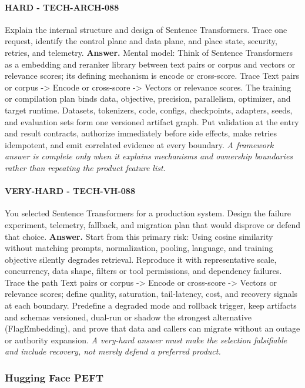 \paragraph{HARD - TECH-ARCH-088} Explain the internal structure and design of Sentence Transformers. Trace one request, identify the control plane and data plane, and place state, security, retries, and telemetry.
\textbf{Answer.} Mental model: Think of Sentence Transformers as a embedding and reranker library between text pairs or corpus and vectors or relevance scores; its defining mechanism is encode or cross-score. Trace Text pairs or corpus -> Encode or cross-score -> Vectors or relevance scores. The training or compilation plan binds data, objective, precision, parallelism, optimizer, and target runtime. Datasets, tokenizers, code, configs, checkpoints, adapters, seeds, and evaluation sets form one versioned artifact graph. Put validation at the entry and result contracts, authorize immediately before side effects, make retries idempotent, and emit correlated evidence at every boundary.
\textit{A framework answer is complete only when it explains mechanisms and ownership boundaries rather than repeating the product feature list.}
\paragraph{VERY-HARD - TECH-VH-088} You selected Sentence Transformers for a production system. Design the failure experiment, telemetry, fallback, and migration plan that would disprove or defend that choice.
\textbf{Answer.} Start from this primary risk: Using cosine similarity without matching prompts, normalization, pooling, language, and training objective silently degrades retrieval. Reproduce it with representative scale, concurrency, data shape, filters or tool permissions, and dependency failures. Trace the path Text pairs or corpus -> Encode or cross-score -> Vectors or relevance scores; define quality, saturation, tail-latency, cost, and recovery signals at each boundary. Predefine a degraded mode and rollback trigger, keep artifacts and schemas versioned, dual-run or shadow the strongest alternative (FlagEmbedding), and prove that data and callers can migrate without an outage or authority expansion.
\textit{A very-hard answer must make the selection falsifiable and include recovery, not merely defend a preferred product.}
\subsubsection*{Hugging Face PEFT}
